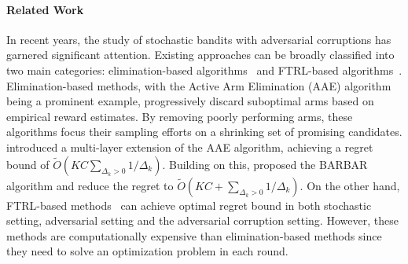 \paragraph{Related Work}

In recent years, the study of stochastic bandits with adversarial corruptions has garnered significant attention. Existing approaches can be broadly classified into two main categories: elimination-based algorithms~\citep{lykouris2018stochastic, gupta2019better, liu2021cooperative, lu2021stochastic} and FTRL-based algorithms~\citep{zimmert2021tsallis, ito2021parameter, jin2024improved, tsuchiya2024stability}. Elimination-based methods, with the Active Arm Elimination (AAE) algorithm~\citep{even2006action} being a prominent example, progressively discard suboptimal arms based on empirical reward estimates. By removing poorly performing arms, these algorithms focus their sampling efforts on a shrinking set of promising candidates. \cite{lykouris2018stochastic} introduced a multi-layer extension of the AAE algorithm, achieving a regret bound of $\widetilde{O}\left(KC\sum_{\Delta_k > 0} 1 / \Delta_k\right)$. Building on this, \cite{gupta2019better} proposed the BARBAR algorithm and reduce the regret to $\widetilde{O}\left(KC + \sum_{\Delta_k > 0} 1 / \Delta_k\right)$. On the other hand, FTRL-based methods~\citep{bubeck2012best, seldin2014one, auer2016algorithm, wei2018more, zimmert2021tsallis, ito2021parameter, jin2024improved, tsuchiya2024stability} can achieve optimal regret bound in both stochastic setting, adversarial setting and the adversarial corruption setting. However, these methods are computationally expensive than elimination-based methods since they need to solve an optimization problem in each round. 

